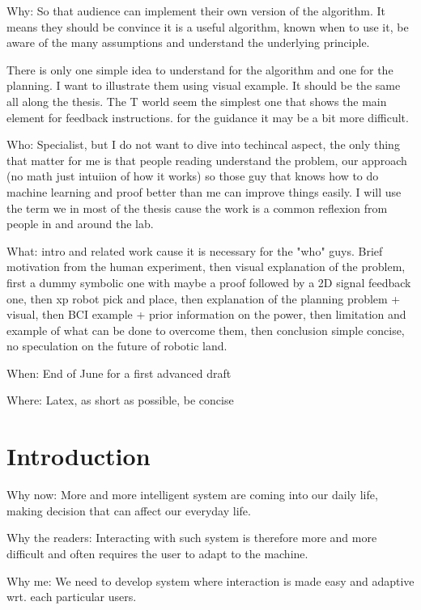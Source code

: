 
Why: So that audience can implement their own version of the algorithm. It means they should be convince it is a useful algorithm, known when to use it, be aware of the many assumptions and understand the underlying principle. 

There is only one simple idea to understand for the algorithm and one for the planning. I want to illustrate them using visual example. It should be the same all along the thesis. The T world seem the simplest one that shows the main element for feedback instructions. for the guidance it may be a bit more difficult.

Who: Specialist, but I do not want to dive into techincal aspect, the only thing that matter for me is that people reading understand the problem, our approach (no math just intuiion of how it works) so those guy that knows how to do machine learning and proof better than me can improve things easily. I will use the term we in most of the thesis cause the work is a common reflexion from people in and around the lab.

What: intro and related work cause it is necessary for the "who" guys. Brief motivation from the human experiment, then visual explanation of the problem, first a dummy symbolic one with maybe a proof followed by a 2D signal feedback one, then xp robot pick and place, then explanation of the planning problem + visual, then BCI example + prior information on the power, then limitation and example of what can be done to overcome them, then conclusion simple concise, no speculation on the future of robotic land.

When: End of June for a first advanced draft

Where: Latex, as short as possible, be concise

\chapter{Introduction}
\minitoc

Why now: More and more intelligent system are coming into our daily life, making decision that can affect our everyday life. 

Why the readers: Interacting with such system is therefore more and more difficult and often requires the user to adapt to the machine.

Why me: We need to develop system where interaction is made easy and adaptive wrt. each particular users. 

